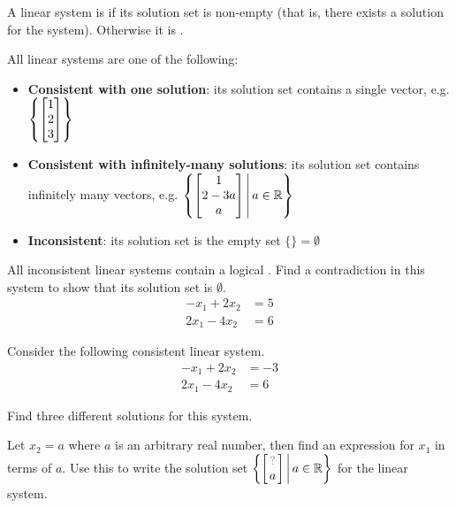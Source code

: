 \begin{definition}
  A linear system is  if its solution set
  is non-empty (that is, there exists a solution for the
  system). Otherwise it is .
\end{definition}

\begin{fact}
  All linear systems are one of the following:
  \begin{itemize}
    \item \textbf{Consistent with one solution}:
          its solution set contains a single vector, e.g.
          \(\left\{\begin{bmatrix}1\\2\\3\end{bmatrix}\right\}\)
    \item \textbf{Consistent with infinitely-many solutions}:
          its solution set contains infinitely many vectors, e.g.
          \(
            \left\{
              \begin{bmatrix}1\\2-3a\\a\end{bmatrix}
            \,\middle|\,
              a\in\mathbb{R}
            \right\}
          \)
    \item \textbf{Inconsistent}:
          its solution set is the empty set \(\{\}=\emptyset\)
  \end{itemize}
\end{fact}

\begin{activity}{10}
  All inconsistent linear systems contain a logical .
  Find a contradiction in this system to show that its solution set
  is \(\emptyset\).
  \begin{align*}
  -x_1+2x_2  &=  5 \\
  2x_1-4x_2  &=  6
  \end{align*}
\end{activity}

\begin{activity}{10}
  Consider the following consistent linear system.
  \begin{align*}
  -x_1+2x_2  &= -3 \\
  2x_1-4x_2  &=  6
  \end{align*}
\begin{subactivity}
  Find three different solutions
  for this system.
\end{subactivity}
\begin{subactivity}
  Let \(x_2=a\) where \(a\) is an arbitrary real number, then find an
  expression for \(x_1\) in terms of \(a\). Use this to write
  the solution set
  \(
    \setBuilder
    {
    	\begin{bmatrix}
        \unknown \\
        a
      \end{bmatrix}
    }{
      a \in \IR
	  }
  \)
  for the linear system.
\end{subactivity}
\end{activity}

